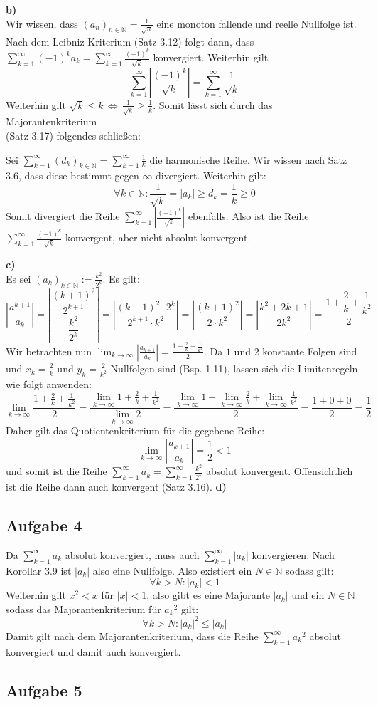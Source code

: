 \documentclass[a4paper,graphics,11pt]{article}
\newcommand{\aufgabe}[1]{\subsection*{Aufgabe #1}}
\begin{document}
\textbf{b)}\\[5pt]
Wir wissen, dass $(a_n)_{n\in \mathbb{N}} = \frac{1}{\sqrt{n}}$ eine monoton fallende und
reelle Nullfolge ist. Nach dem Leibniz-Kriterium (Satz 3.12) folgt dann, dass
$\sum_{k=1}^{\infty} (-1)^ka_k = \sum_{k=1}^{\infty} \frac{(-1)^k}{\sqrt{k}}$ konvergiert.
Weiterhin gilt
$$
    \sum_{k=1}^{\infty} \left|\frac{(-1)^k}{\sqrt{k}}\right|
    = \sum_{k=1}^{\infty} \frac{1}{\sqrt{k}}
$$
Weiterhin gilt $\sqrt{k} \leq k \,\Longleftrightarrow\, \frac{1}{\sqrt{k}}\geq \frac{1}{k}$.
Somit lässt sich durch das Majorantenkriterium \\
(Satz 3.17) folgendes schließen:

Sei $\sum_{k=1}^{\infty} (d_k)_{k\in \mathbb{N}}= \sum_{k=1}^{\infty} \frac{1}{k}$ die
harmonische Reihe. Wir wissen nach Satz 3.6, dass diese bestimmt gegen $\infty$ divergiert.
Weiterhin gilt:
$$
    \forall k \in \mathbb{N}\colon \frac{1}{\sqrt{k}} = |a_k| \geq d_k = \frac{1}{k} \geq 0
$$
Somit divergiert die Reihe $\sum_{k=1}^{\infty}\left|\frac{(-1)^k}{\sqrt{k}}\right|$
ebenfalls. Also ist die Reihe $\sum_{k=1}^{\infty} \frac{(-1)^k}{\sqrt{k}}$ konvergent, aber nicht
absolut konvergent.

\textbf{c)}\\[5pt]
Es sei $\displaystyle(a_k)_{k \in \mathbb{N}} := \frac{k^2}{2^k}$. Es gilt:
$$
    \left|\frac{a^{k+1}}{a_k}\right|
    = \left|\frac{\dfrac{(k+1)^2}{2^{k+1}}}{{\dfrac{k^2}{2^k}}}\right|
    = \left|\frac{(k+1)^2 \cdot 2^k}{2^{k+1}\cdot k^2}\right|
    = \left|\frac{(k+1)^2}{2\cdot k^2}\right|
    = \left|\frac{k^2+2k+1}{2k^2} \right|
    = \frac{1+\dfrac{2}{k}+\dfrac{1}{k^2}}{2}
$$
Wir betrachten nun $\displaystyle\lim_{k \to \infty}\limits \left|\frac{a_{k+1}}{a_k}\right|
= \frac{1+\frac{2}{k}+\frac{1}{k^2}}{2}$. Da $1$ und $2$ konstante Folgen sind und
$x_k=\frac{2}{k}$ und $y_k=\frac{2}{k^2}$ Nullfolgen sind (Bsp. 1.11), lassen sich
die Limitenregeln wie folgt anwenden:
$$
    \lim_{k \to \infty} \frac{1+\frac{2}{k}+\frac{1}{k^2}}{2}
    = \frac{\lim_{k\to\infty}\limits1+\frac{2}{k}+\frac{1}{k^2}}{\lim_{k \to \infty}\limits 2}
    = \frac{\lim_{k \to \infty}\limits 1 + \lim_{k \to \infty}\limits \frac{2}{k}+ \lim_{k \to \infty} \frac{1}{k^2}}{2}
    = \frac{1+0+0}{2} = \frac{1}{2}
$$
Daher gilt das Quotientenkriterium für die gegebene Reihe:
$$
    \lim_{k \to \infty} \left|\frac{a_{k+1}}{a_k}\right| = \frac{1}{2} < 1
$$
und somit ist die Reihe $\displaystyle\sum_{k=1}^{\infty} a_k = \sum_{k=1}^{\infty} \frac{k^2}{2^k}$
absolut konvergent. Offensichtlich ist die Reihe dann auch konvergent (Satz 3.16).
\newpage
\textbf{d)}\\[5pt]
\newpage
\aufgabe{4}
Da $\sum_{k=1}^{\infty} a_k$ absolut konvergiert, muss auch $\sum_{k=1}^{\infty} |a_k|$
konvergieren. Nach Korollar 3.9 ist $|a_k|$ also eine Nullfolge.
Also existiert ein $N \in \mathbb{N}$ sodass gilt:
$$
    \forall k > N \colon |a_k| < 1
$$
Weiterhin gilt $x^2 < x$ für $|x| < 1$, also gibt es eine Majorante $|a_k|$ und ein
$N \in \mathbb{N}$ sodass das Majorantenkriterium für ${a_k}^2$ gilt:
$$
    \forall k > N \colon |{a_k}|^2 \leq |a_k|
$$
Damit gilt nach dem Majorantenkriterium, dass die Reihe $\sum_{k=1}^{\infty} {a_k}^2$
absolut konvergiert und damit auch konvergiert.
\newpage
\aufgabe{5}
\end{document}
